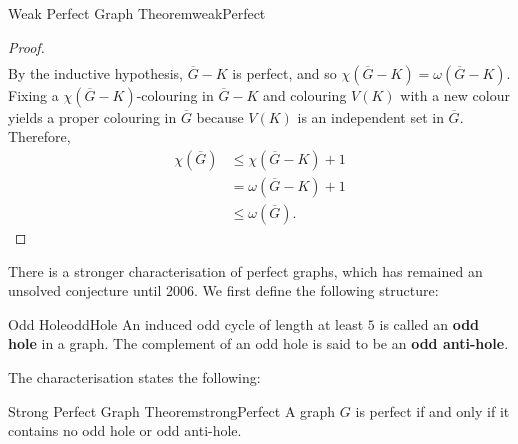\documentclass[math, code]{amznotes}
\theoremstyle{remark}
\begin{document}
\begin{thmbox}{Weak Perfect Graph Theorem}{weakPerfect}
\begin{proof}
\begin{align*}
        \end{align*}
        By the inductive hypothesis, $\overline{G} - K$ is perfect, and so $\chi\left(\overline{G} - K\right) = \omega\left(\overline{G} - K\right)$. Fixing a $\chi\left(\overline{G} - K\right)$-colouring in $\overline{G} - K$ and colouring $V(K)$ with a new colour yields a proper colouring in $\overline{G}$ because $V(K)$ is an independent set in $\overline{G}$. Therefore,
        \begin{align*}
            \chi\left(\overline{G}\right) & \leq \chi\left(\overline{G} - K\right) + 1 \\
            & = \omega\left(\overline{G} - K\right) + 1 \\
            & \leq \omega\left(\overline{G}\right).
        \end{align*}
    \end{proof}
\end{thmbox}
There is a stronger characterisation of perfect graphs, which has remained an unsolved conjecture until 2006. We first define the following structure:
\begin{dfnbox}{Odd Hole}{oddHole}
    An induced odd cycle of length at least $5$ is called an {\color{red} \textbf{odd hole}} in a graph. The complement of an odd hole is said to be an {\color{red} \textbf{odd anti-hole}}.
\end{dfnbox}
The characterisation states the following:
\begin{thmbox}{Strong Perfect Graph Theorem}{strongPerfect}
    A graph $G$ is perfect if and only if it contains no odd hole or odd anti-hole.
\end{thmbox}
\end{document}

